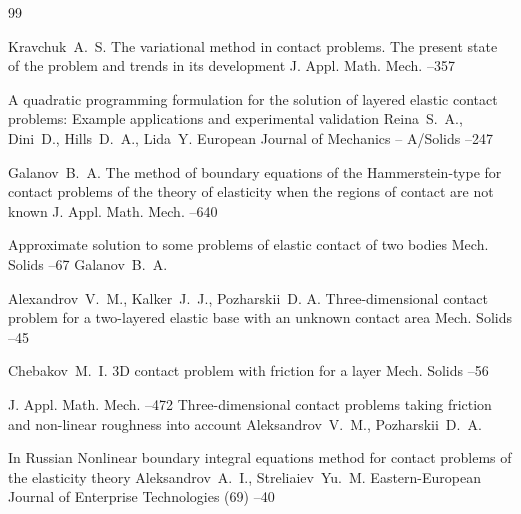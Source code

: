 \begin{thebibliography}{99}

\by Kravchuk~A.~S.
\paper The variational method in contact problems. The present state of the problem and trends in its development 
\jour J. Appl. Math. Mech. 
–357


\paper A quadratic programming formulation for the solution of layered elastic contact problems: Example applications and experimental validation
\by    Reina~S.~A., Dini~D.,  Hills~D.~A., Lida~Y.
\jour European Journal of Mechanics -- A/Solids
--247

\by Galanov~B.~A.
\paper The method of boundary equations of the Hammerstein-type for contact problems of the theory of elasticity when the regions of contact are not known
\jour J. Appl. Math. Mech. 
--640 

	
\paper Approximate solution to some problems of elastic contact of two bodies
\jour Mech. Solids
–67
\by Galanov~B.~A.



\by  Alexandrov~V.~M., Kalker~J.~J., Pozharskii~D. A.
\paper Three-dimensional contact problem for a two-layered elastic base with an unknown contact area
\jour Mech. Solids
--45

\by Chebakov~M.~I. 
\paper 3D contact problem with friction for a layer 
\jour Mech. Solids
–56


\jour J. Appl. Math. Mech.
--472
\paper Three-dimensional contact problems taking friction and non-linear roughness into account
\by  Aleksandrov~V.~M.,  Pozharskii~D.~A.

\lang In Russian
\paper Nonlinear boundary integral equations method for contact problems of the elasticity theory
\by  Aleksandrov~A.~I., Streliaiev~Yu.~M. 
\jour Eastern-European Journal of Enterprise Technologies
(69)
--40


\end{thebibliography}
